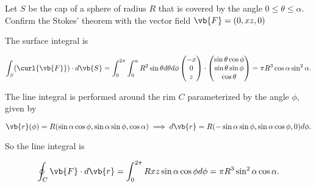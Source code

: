 \documentclass[english,a4paper,12pt]{report}
\begin{document}

{Let \(S\) be the cap of a sphere of radius \(R\) that is covered by the angle \(0 \le \theta \le \alpha \). Confirm the Stokes' theorem with the vector field \(\vb{F} = (0,xz,0)\)  }
{The surface integral is 

\begin{equation}
	\int_{S}^{} (\curl{\vb{F} } ) \cdot d\vb{S}  = \int_{0}^{2\pi } \int_{0}^{\alpha } R^2\sin \theta d \theta d\phi \begin{pmatrix}
		 -x \\
		 0 \\
		 z \\
	\end{pmatrix} \cdot  \begin{pmatrix}
		 \sin \theta \cos \phi  \\
		 \sin \theta \sin \phi  \\
		 \cos \theta  \\
	\end{pmatrix} = \pi R^3 \cos \alpha \sin ^2 \alpha .    
\end{equation}

The line integral is performed around the rim \(C\) parameterized by the angle \(\phi \), given by 

\begin{equation}
	\vb{r} (\phi ) = R(\sin \alpha \cos \phi ,\sin \alpha \sin \phi ,\cos \alpha ) \implies d\vb{r} = R(-\sin \alpha \sin \phi , \sin \alpha \cos \phi , 0)d\phi.
\end{equation}

So the line integral is

\begin{equation}
	\oint_{C} \vb{F} \cdot d\vb{r} = \int_{0}^{2\pi } Rxz \sin \alpha \cos \phi d\phi = \pi R^3 \sin ^2\alpha \cos \alpha .  
\end{equation}

} 
\end{document}
